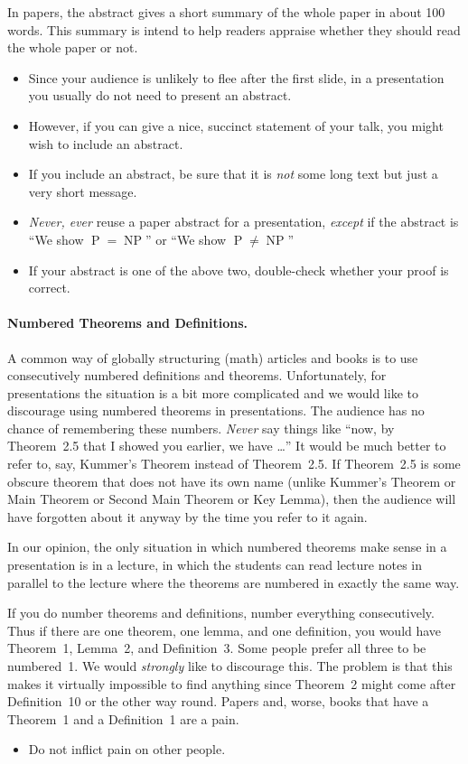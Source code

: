 In papers, the abstract gives a short summary of the whole paper in about 100 words. This summary is intend to help readers appraise whether they should read the whole paper or not.
\begin{itemize}
\item
  Since your audience is unlikely to flee after the first slide, in a presentation you usually do not need to present an abstract.
\item
  However, if you can give a nice, succinct statement of your talk, you might wish to include an abstract.
\item
  If you include an abstract, be sure that it is \emph{not} some long text but just a very short message.
\item
  \emph{Never, ever} reuse a paper abstract for a presentation, \emph{except} if the abstract is ``We show $\operatorname{P} = \operatorname{NP}$'' or ``We show $\operatorname{P} \neq \operatorname{NP}$''
\item
  If your abstract is one of the above two, double-check whether your proof is correct.
\end{itemize}

\paragraph{Numbered Theorems and Definitions.}

A common way of globally structuring (math) articles and books is to use consecutively numbered definitions and theorems. Unfortunately, for presentations the situation is a bit more complicated and we would like to discourage using numbered theorems in presentations. The audience has no chance of remembering these numbers. \emph{Never} say things like ``now, by Theorem~2.5 that I showed you earlier, we have \dots'' It would be much better to refer to, say, Kummer's Theorem instead of Theorem~2.5. If Theorem~2.5 is some obscure theorem that does not have its own name (unlike Kummer's Theorem or Main Theorem or Second Main Theorem or Key Lemma), then the audience will have forgotten about it anyway by the time you refer to it again.

In our opinion, the only situation in which numbered theorems make sense in a presentation is in a lecture, in which the students can read lecture notes in parallel to the lecture where the theorems are numbered in exactly the same way.

If you do number theorems and definitions, number everything consecutively. Thus if there are one theorem, one lemma, and one definition, you would have Theorem~1, Lemma~2, and Definition~3. Some people prefer all three to be numbered~1. We would \emph{strongly} like to discourage this. The problem is that this makes it virtually impossible to find anything since Theorem~2 might come after Definition~10 or the other way round. Papers and, worse, books that have a Theorem~1 and a Definition~1 are a pain.
\begin{itemize}
\item
  Do not inflict pain on other people.
\end{itemize}

